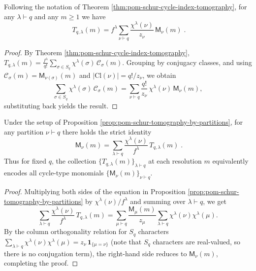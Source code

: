 \begin{proposition}\label{prop:pom-schur-tomography-by-partitions}
Following the notation of Theorem \ref{thm:pom-schur-cycle-index-tomography}, for any \(\lambda\vdash q\) and any \(m\ge 1\) we have
\[
\boxed{\;
T_{q,\lambda}(m)
=
f^\lambda\sum_{\nu\vdash q}\frac{\chi^\lambda(\nu)}{z_\nu}\,\mathsf{M}_\nu(m)\; }.
\]
\end{proposition}
\begin{proof}
By Theorem \ref{thm:pom-schur-cycle-index-tomography},
\(
T_{q,\lambda}(m)
=\frac{f^\lambda}{q!}\sum_{\sigma\in S_q}\chi^\lambda(\sigma)\,\mathcal{C}_\sigma(m)
\).
Grouping by conjugacy classes, and using \(\mathcal{C}_\sigma(m)=\mathsf{M}_{\nu(\sigma)}(m)\) and \(|\mathrm{Cl}(\nu)|=q!/z_\nu\), we obtain
\[
\sum_{\sigma\in S_q}\chi^\lambda(\sigma)\,\mathcal{C}_\sigma(m)
=\sum_{\nu\vdash q}\frac{q!}{z_\nu}\,\chi^\lambda(\nu)\,\mathsf{M}_\nu(m),
\]
substituting back yields the result.
\end{proof}

\begin{theorem}\label{thm:pom-schur-tomography-inverse-partition-monomials}
Under the setup of Proposition \ref{prop:pom-schur-tomography-by-partitions}, for any partition \(\nu\vdash q\) there holds the strict identity
\[
\boxed{\;
\mathsf{M}_\nu(m)
=\sum_{\lambda\vdash q}\frac{\chi^\lambda(\nu)}{f^\lambda}\,T_{q,\lambda}(m)\; }.
\]
Thus for fixed \(q\), the collection \(\{T_{q,\lambda}(m)\}_{\lambda\vdash q}\) at each resolution \(m\) equivalently encodes all cycle-type monomials \(\{\mathsf{M}_\nu(m)\}_{\nu\vdash q}\).
\end{theorem}
\begin{proof}
Multiplying both sides of the equation in Proposition \ref{prop:pom-schur-tomography-by-partitions} by \(\chi^\lambda(\nu)/f^\lambda\) and summing over \(\lambda\vdash q\), we get
\[
\sum_{\lambda\vdash q}\frac{\chi^\lambda(\nu)}{f^\lambda}\,T_{q,\lambda}(m)
=\sum_{\mu\vdash q}\frac{\mathsf{M}_\mu(m)}{z_\mu}\sum_{\lambda\vdash q}\chi^\lambda(\nu)\chi^\lambda(\mu).
\]
By the column orthogonality relation for \(S_q\) characters
\(
\sum_{\lambda\vdash q}\chi^\lambda(\nu)\chi^\lambda(\mu)=z_\nu\,\mathbf 1_{\{\mu=\nu\}}
\)
(note that \(S_q\) characters are real-valued, so there is no conjugation term), the right-hand side reduces to \(\mathsf{M}_\nu(m)\), completing the proof.
\end{proof}

